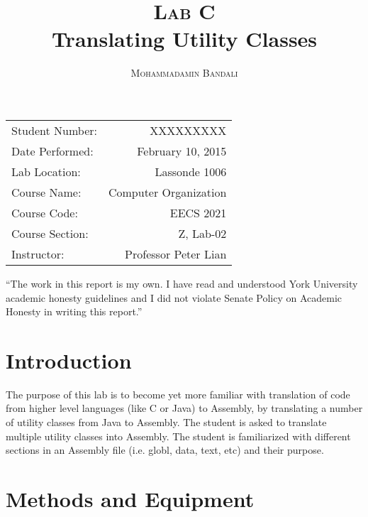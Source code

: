 \documentclass{article}
\title{\textsc{Lab C} \\ Translating Utility Classes } %
\author{\textsc{Mohammadamin Bandali}} %
\date{} %
\newenvironment{statement}{\par\vspace{50ex}}{\clearpage}
\begin{document}
\maketitle %

\begin{center}
\begin{tabular}{l r}
Student Number: & XXXXXXXXX \\ 
Date Performed: & February 10, 2015 \\ %
Lab Location: & Lassonde 1006 \\ 
Course Name: & Computer Organization \\ 
Course Code: & EECS 2021 \\ 
Course Section: & Z, Lab-02\\ 
Instructor: & Professor Peter Lian %
\end{tabular}
\end{center}

\begin{statement}
“The work in this report is my own. I have read and understood York University
academic honesty guidelines and I did not violate Senate Policy on Academic
Honesty in writing this report.”
\end{statement}


\section{Introduction}

The purpose of this lab is to become yet more familiar with translation of code from higher level languages (like C or Java) to Assembly, by translating a number of utility classes from Java to Assembly. The student is asked to translate multiple utility classes into Assembly. The student is familiarized with different sections in an Assembly file (i.e. globl, data, text, etc) and their purpose.


\section{Methods and Equipment}
\end{document}
